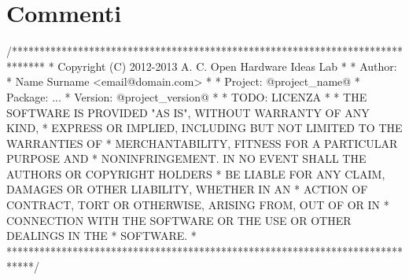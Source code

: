 %
%

\section{Commenti}\label{sec:comments}

\begin{minipage}[t]{\rbwidth}
\begin{RightSmallCode}
/******************************************************************************
 * Copyright (C) 2012-2013 A. C. Open Hardware Ideas Lab
 *
 * Author:
 *   Name Surname <email@domain.com>
 *
 * Project: @project_name@
 * Package: ...
 * Version: @project_version@
 *
 * TODO: LICENZA
 *
 * THE SOFTWARE IS PROVIDED "AS IS", WITHOUT WARRANTY OF ANY KIND,
 * EXPRESS OR IMPLIED, INCLUDING BUT NOT LIMITED TO THE WARRANTIES OF
 * MERCHANTABILITY, FITNESS FOR A PARTICULAR PURPOSE AND
 * NONINFRINGEMENT. IN NO EVENT SHALL THE AUTHORS OR COPYRIGHT HOLDERS
 * BE LIABLE FOR ANY CLAIM, DAMAGES OR OTHER LIABILITY, WHETHER IN AN
 * ACTION OF CONTRACT, TORT OR OTHERWISE, ARISING FROM, OUT OF OR IN
 * CONNECTION WITH THE SOFTWARE OR THE USE OR OTHER DEALINGS IN THE
 * SOFTWARE.
 *
 *****************************************************************************/
\end{RightSmallCode}
\end{minipage}%
